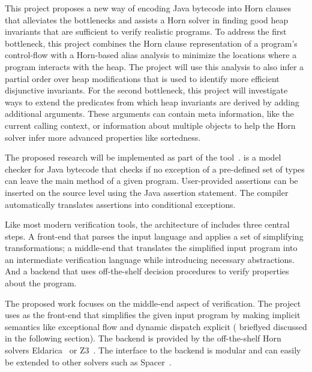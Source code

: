 This project proposes a new way of encoding Java bytecode into Horn clauses
that alleviates the bottlenecks and assists a Horn solver 
in finding good heap invariants that are sufficient
to verify realistic programs. To address the first bottleneck, 
this project combines the Horn clause 
representation of a program's control-flow with a Horn-based alias analysis 
to minimize the locations where a program interacts with the heap. 
The project will use this analysis to also infer a partial order over heap modifications that
is used to identify more efficient disjunctive invariants. For the second
bottleneck, this project will investigate ways to extend the predicates from
which heap invariants are derived by adding additional arguments. These
arguments can contain meta information, like the current calling context,
or information about multiple objects to help the Horn solver infer
more advanced properties like sortedness.


The proposed research will be implemented as
 part of the \jayhorn tool~\cite{jayhorn16}. \jayhorn is a model checker for Java 
bytecode that checks if no exception of a pre-defined set of types can leave the main 
method of a given program. User-provided assertions can be inserted on the source level
using the Java assertion statement. The compiler automatically translates assertions into conditional
exceptions.


Like most modern verification tools, the architecture of \jayhorn includes three 
central steps. A front-end that parses the input language and applies a set of 
simplifying transformations; a middle-end that translates the simplified input
program into an intermediate verification language while introducing necessary
abstractions. And a backend that uses off-the-shelf decision procedures to verify
properties about the program.

The proposed work focuses on the middle-end aspect of verification. The project uses \jayhorn
as the front-end that simplifies the given input program
by making implicit semantics like exceptional flow and dynamic dispatch explicit (
brieflyed discussed in the following section). The backend is provided 
by the off-the-shelf Horn solvers Eldarica~\cite{Rummer:2013:DIH:2526861.2526891} 
or Z3~\cite{demoura2008z3}. The interface to the backend is modular and can easily 
be extended to other solvers such as Spacer~\cite{Komuravelli:2014:SMC:2735050.2735053}.




